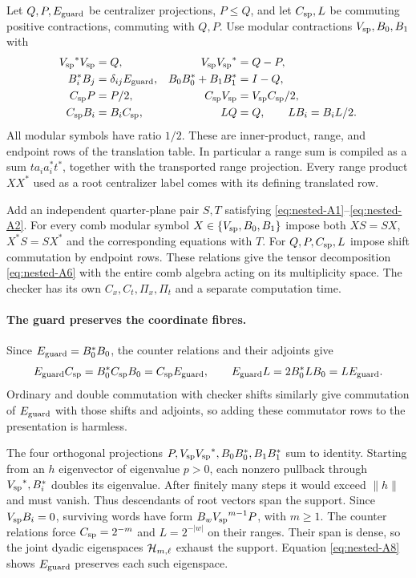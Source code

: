 Let $Q,P,{E_{\rm guard}}$ be centralizer projections, $P\le Q$, and let $C_{\rm sp},L$ be
commuting positive contractions, commuting with $Q,P$. Use modular
contractions ${V_{\rm sp}},B_0,B_1$ with
\begin{align*}
 {V_{\rm sp}}^*{V_{\rm sp}}&=Q,& {V_{\rm sp}}{V_{\rm sp}}^*&=Q-P,\\
 B_i^*B_j&=\delta_{ij}{E_{\rm guard}},& B_0B_0^*+B_1B_1^*&=I-Q,\\
 C_{\rm sp} P&=P/2,& C_{\rm sp}{V_{\rm sp}}&={V_{\rm sp}}C_{\rm sp}/2,\\
 C_{\rm sp} B_i&=B_iC_{\rm sp},& LQ&=Q,\qquad LB_i=B_iL/2.
\end{align*}
All modular symbols have ratio $1/2$. These are inner-product, range,
and endpoint rows of the translation table. In particular a range sum
is compiled as a sum $ta_ia_i^*t^*$, together with the transported
range projection. Every range product $XX^*$ used as a root
centralizer label comes with its defining translated row.

Add an independent quarter-plane pair $S,T$ satisfying \eqref{eq:nested-A1}--\eqref{eq:nested-A2}.
For every comb modular symbol $X\in\{{V_{\rm sp}},B_0,B_1\}$ impose both
$XS=SX$, $X^*S=SX^*$ and the corresponding equations with $T$.
For $Q,P,C_{\rm sp},L$ impose shift commutation by endpoint rows. These
relations give the tensor decomposition \eqref{eq:nested-A6} with the entire comb
algebra acting on its multiplicity space. The checker has its own
$C_x,C_t,\Pi_x,\Pi_t$ and a separate computation time.

\paragraph{The guard preserves the coordinate fibres.}
Since ${E_{\rm guard}}=B_0^*B_0$, the counter relations and their adjoints give
\begin{equation}
 {E_{\rm guard}}C_{\rm sp}=B_0^*C_{\rm sp} B_0=C_{\rm sp}{E_{\rm guard}},\qquad
 {E_{\rm guard}}L=2B_0^*LB_0=L{E_{\rm guard}}.                                           \label{eq:nested-A8}
\end{equation}
Ordinary and double commutation with checker shifts similarly give
commutation of ${E_{\rm guard}}$ with those shifts and adjoints, so adding
these commutator rows to the presentation is harmless.

The four orthogonal projections $P,{V_{\rm sp}}{V_{\rm sp}}^*,B_0B_0^*,B_1B_1^*$ sum to
identity. Starting from an $h$ eigenvector of eigenvalue $p>0$, each
nonzero pullback through ${V_{\rm sp}}^*,B_i^*$ doubles its eigenvalue. After
finitely many steps it would exceed $\|h\|$ and must vanish.
Thus descendants of root vectors span the support. Since ${V_{\rm sp}}B_i=0$,
surviving words have form $B_w{V_{\rm sp}}^{m-1}P$, with $m\ge1$.
The counter relations force $C_{\rm sp}=2^{-m}$ and $L=2^{-|w|}$ on their
ranges. Their span is dense, so the joint dyadic eigenspaces
$\mathcal H_{m,\ell}$ exhaust the support.
Equation \eqref{eq:nested-A8} shows ${E_{\rm guard}}$ preserves each such eigenspace.

